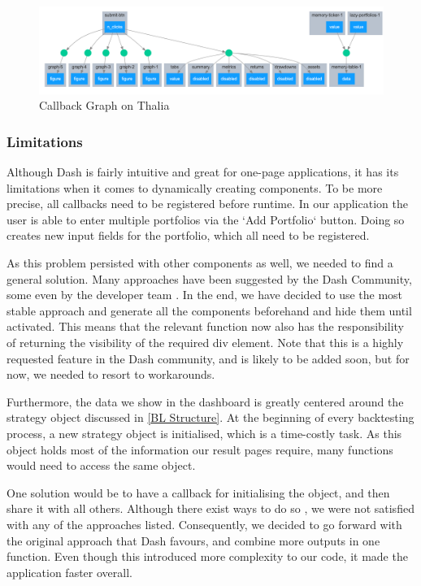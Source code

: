 \documentclass[main.tex]{subfiles}
\begin{document}
 \begin{figure}[H]
   \centering
   \includegraphics[scale=0.6]{05Coding/05Pictures/callback_graph.png}
   \caption{Callback Graph on Thalia}
   \label{callback_graph}
\end{figure}


\subsubsection*{Limitations}
\label{dash_limitations}

Although Dash is fairly intuitive and great for one-page applications, it has its limitations when it comes to dynamically creating components. To be more precise, all callbacks need to be registered before runtime. In our application the user is able to enter multiple portfolios via the `Add Portfolio` button. Doing so creates new input fields for the portfolio, which all need to be registered. 

As this problem persisted with other components as well, we needed to find a general solution. Many approaches have been suggested by the Dash Community, some even by the developer team \cite{dash_workaround}. In the end, we have decided to use the most stable approach and generate all the components beforehand and hide them until activated. This means that the relevant function now also has the responsibility of returning the visibility of the required div element. Note that this is a highly requested feature in the Dash community, and is likely to be added soon, but for now, we needed to resort to workarounds.

Furthermore, the data we show in the dashboard is greatly centered around the strategy object discussed in \ref{BL Structure}. At the beginning of every backtesting process, a new strategy object is initialised, which is a time-costly task. As this object holds most of the information our result pages require, many functions would need to access the same object. 

One solution would be to have a callback for initialising the object, and then share it with all others. Although there exist ways to do so \cite{dash_share}, we were not satisfied with any of the approaches listed. Consequently, we decided to go forward with the original approach that Dash favours, and combine more outputs in one function. Even though this introduced more complexity to our code, it made the application faster overall.
\end{document}
